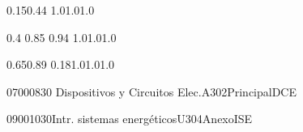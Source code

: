 \documentclass[a4paper,10pt]{report}
\begin{document}
 \thispagestyle{empty}
 \begin{landscape}
 
 \setslotsize{3cm}{0.33cm}
 \settextframe{1.0mm}
 
 
 
  {0.15}{0.44} {1.0}{1.0}{1.0}
 
      {0.4} {0.85} {0.94} {1.0}{1.0}{1.0}
 
        {0.65}{0.89} {0.18}{1.0}{1.0}{1.0}

 
 
 
 
 
 
 \begin{timetable}
 

 
   
   
    {0700}{0830}{ Dispositivos y Circuitos Elec.}{A302}{{\tiny Principal}}{DCE}
   
    {0900}{1030}{Intr. sistemas energéticos}{U304}{{\tiny  Anexo}}{ISE}
   

    

\end{timetable}
\end{landscape}
\end{document}
